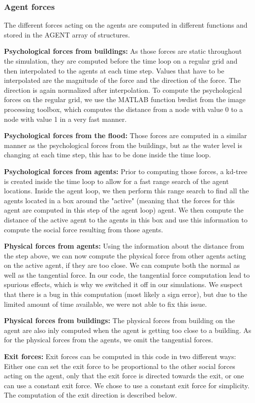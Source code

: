 \documentclass[11pt]{article}
\begin{document}
\subsubsection{Agent forces}
The different forces acting on the agents are computed in different functions and stored in the AGENT array of structures.
\begin{description}
\item{\textbf{Psychological forces from buildings: }}As those forces are static throughout the simulation, they are computed before the time loop on a regular grid and then interpolated to the agents at each time step. Values that have to be interpolated are the magnitude of the force and the direction of the force. The direction is again normalized after interpolation. To compute the psychological forces on the regular grid, we use the MATLAB function bwdist from the image processing toolbox, which computes the distance from a node with value 0 to a node with value 1 in a very fast manner. 
\item{\textbf{Psychological forces from the flood: }}Those forces are computed in a similar manner as the psychological forces from the buildings, but as the water level is changing at each time step, this has to be done inside the time loop.
\item{\textbf{Psychological forces from agents: }}Prior to computing those forces, a kd-tree \citep{kdtree} is created inside the time loop to allow for a fast range search of the agent locations. Inside the agent loop, we then perform this range search to find all the agents located in a box around the "active" (meaning that the forces for this agent are computed in this step of the agent loop) agent. We then compute the distance of the active agent to the agents in this box and use this information to compute the social force resulting from those agents.
\item{\textbf{Physical forces from agents: }}Using the information about the distance from the step above, we can now compute the physical force from other agents acting on the active agent, if they are too close. We can compute both the normal as well as the tangential force. In our code, the tangential force computation lead to spurious effects, which is why we switched it off in our simulations. We suspect that there is a bug in this computation (most likely a sign error), but due to the limited amount of time available, we were not able to fix this issue.
\item{\textbf{Physical forces from buildings: }}The physical forces from building on the agent are also inly computed when the agent is getting too close to a building. As for the physical forces from the agents, we omit the tangential forces.
\item{\textbf{Exit forces: }}Exit forces can be computed in this code in two different ways: Either one can set the exit force to be proportional to the other social forces acting on the agent, only that the exit force is directed towards the exit, or one can use a constant exit force. We chose to use a constant exit force for simplicity. The computation of the exit direction is described below.
\end{description}
\end{document}
